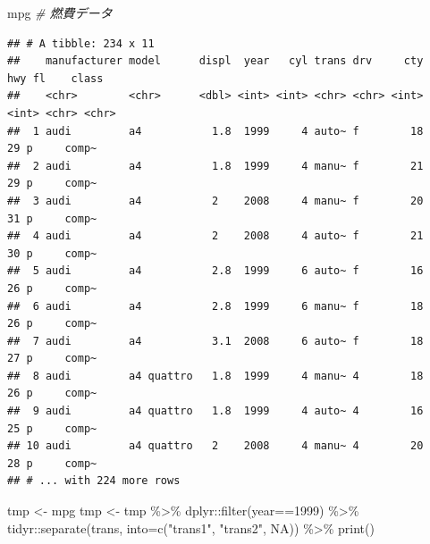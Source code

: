 \documentclass[
]{article}
\newenvironment{Shaded}{\begin{snugshade}}{\end{snugshade}}
\newcommand{\AttributeTok}[1]{\textcolor[rgb]{0.77,0.63,0.00}{#1}}
\newcommand{\CommentTok}[1]{\textcolor[rgb]{0.56,0.35,0.01}{\textit{#1}}}
\newcommand{\ConstantTok}[1]{\textcolor[rgb]{0.00,0.00,0.00}{#1}}
\newcommand{\DecValTok}[1]{\textcolor[rgb]{0.00,0.00,0.81}{#1}}
\newcommand{\FunctionTok}[1]{\textcolor[rgb]{0.00,0.00,0.00}{#1}}
\newcommand{\NormalTok}[1]{#1}
\newcommand{\OtherTok}[1]{\textcolor[rgb]{0.56,0.35,0.01}{#1}}
\newcommand{\SpecialCharTok}[1]{\textcolor[rgb]{0.00,0.00,0.00}{#1}}
\newcommand{\StringTok}[1]{\textcolor[rgb]{0.31,0.60,0.02}{#1}}
\begin{document}
\begin{Shaded}
\begin{Highlighting}[]
\NormalTok{mpg }\CommentTok{\# 燃費データ}
\end{Highlighting}
\end{Shaded}

\begin{verbatim}
## # A tibble: 234 x 11
##    manufacturer model      displ  year   cyl trans drv     cty   hwy fl    class
##    <chr>        <chr>      <dbl> <int> <int> <chr> <chr> <int> <int> <chr> <chr>
##  1 audi         a4           1.8  1999     4 auto~ f        18    29 p     comp~
##  2 audi         a4           1.8  1999     4 manu~ f        21    29 p     comp~
##  3 audi         a4           2    2008     4 manu~ f        20    31 p     comp~
##  4 audi         a4           2    2008     4 auto~ f        21    30 p     comp~
##  5 audi         a4           2.8  1999     6 auto~ f        16    26 p     comp~
##  6 audi         a4           2.8  1999     6 manu~ f        18    26 p     comp~
##  7 audi         a4           3.1  2008     6 auto~ f        18    27 p     comp~
##  8 audi         a4 quattro   1.8  1999     4 manu~ 4        18    26 p     comp~
##  9 audi         a4 quattro   1.8  1999     4 auto~ 4        16    25 p     comp~
## 10 audi         a4 quattro   2    2008     4 manu~ 4        20    28 p     comp~
## # ... with 224 more rows
\end{verbatim}

\begin{Shaded}
\begin{Highlighting}[]
\NormalTok{tmp }\OtherTok{\textless{}{-}}\NormalTok{ mpg}
\NormalTok{tmp }\OtherTok{\textless{}{-}}
\NormalTok{  tmp }\SpecialCharTok{\%\textgreater{}\%}
\NormalTok{  dplyr}\SpecialCharTok{::}\FunctionTok{filter}\NormalTok{(year}\SpecialCharTok{==}\DecValTok{1999}\NormalTok{) }\SpecialCharTok{\%\textgreater{}\%}
\NormalTok{  tidyr}\SpecialCharTok{::}\FunctionTok{separate}\NormalTok{(trans, }\AttributeTok{into=}\FunctionTok{c}\NormalTok{(}\StringTok{"trans1"}\NormalTok{, }\StringTok{"trans2"}\NormalTok{, }\ConstantTok{NA}\NormalTok{)) }\SpecialCharTok{\%\textgreater{}\%}
  \FunctionTok{print}\NormalTok{()}
\end{Highlighting}
\end{Shaded}
\end{document}
